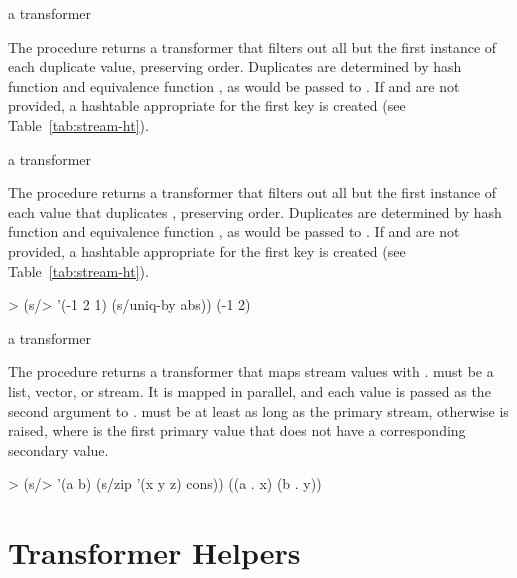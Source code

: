 \begin{procedure}
\end{procedure}
\returns{} a transformer

The  procedure returns a transformer that filters out all but the first
instance of each duplicate value, preserving order. Duplicates are determined by hash
function  and equivalence function , as would be passed to
. If  and  are not provided, a hashtable
appropriate for the first key is created (see Table~\ref{tab:stream-ht}).

\begin{procedure}
\end{procedure}
\returns{} a transformer

The  procedure returns a transformer that filters out all but the first
instance of each value  that duplicates ,
preserving order. Duplicates are determined by hash function  and equivalence
function , as would be passed to . If  and
 are not provided, a hashtable appropriate for the first key is created (see
Table~\ref{tab:stream-ht}).

\codebegin
> (s/> '(-1 2 1) (s/uniq-by abs))
(-1 2)
\codeend

\begin{procedure}
\end{procedure}
\returns{} a transformer

The  procedure returns a transformer that maps stream values with
.  must be a list, vector, or stream. It is mapped in
parallel, and each value is passed as the second argument to .
 must be at least as long as the primary stream, otherwise
 is raised, where  is the first primary
value that does not have a corresponding secondary value.

\codebegin
> (s/> '(a b) (s/zip '(x y z) cons))
((a . x) (b . y))
\codeend

\section {Transformer Helpers}

